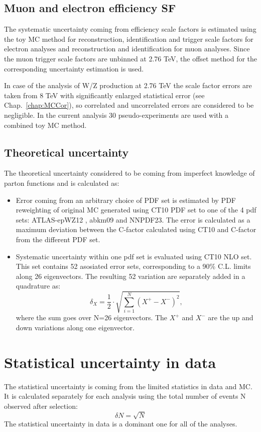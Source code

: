 \subsection{Muon and electron efficiency SF}
The systematic uncertainty coming from efficiency scale factors is estimated using the toy MC method for reconstruction, identification and trigger scale factors for electron analyses and reconstruction and identification for muon analyses. Since the muon trigger scale factors are unbinned at 2.76 TeV, the offset method for the corresponding uncertainty estimation is used.

 In case of the analysis of W/Z production at 2.76 TeV the scale factor errors are taken from 8 TeV with significantly enlarged statistical error (see Chap.~\ref{chap:MCCor}), so correlated and uncorrelated errors are considered to be negligible. In the current analysis 30 pseudo-experiments are used with a combined toy MC method. 
 
 \subsection{Theoretical uncertainty}\label{sec:TheoCw}
 
 The theoretical uncertainty considered to be coming from imperfect knowledge of parton functions and is calculated as:
 \begin{itemize}
 \item  Error coming from an arbitrary choice of PDF set is estimated by PDF reweighting \cite{PDFRew} of original MC generated using CT10 PDF set to one of the 4 pdf sets: ATLAS-epWZ12 \cite{ATLASEP}, abkm09\cite{ABM09} and NNPDF23\cite{NNPDF23}. The error is calculated as a maximum deviation between the C-factor calculated using CT10 and C-factor from the different PDF set. 
\item Systematic uncertainty within one pdf set  is evaluated using CT10 NLO set. This set contains 52 asosiated error sets, corresponding to a 90\% C.L. limits along 26 eigenvectors. The resulting 52 variation are separately added in a quadrature as:
\begin{equation}\label{eq:PDF}
\delta_X=\frac{1}{2}\cdot \sqrt{\sum_{i=1}^{N}(X^+-X^-)^2},
\end{equation}
where the sum goes over N=26 eigenvectors. The $X^+$ and $X^-$ are the up and down variations along one eigenvector. 
\end{itemize}


\section{Statistical uncertainty in data}\label{sec:dataErr}
The statistical uncertainty is coming from the limited statistics in data and MC. It is calculated separately for each analysis using the total number of events N observed after selection:
\begin{equation}
\delta N = \sqrt{N}
\end{equation}
The statistical uncertainty in data is a dominant one for all of the analyses. 


